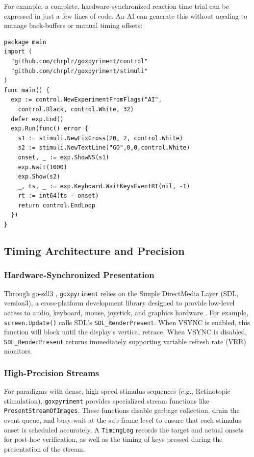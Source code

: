 \documentclass[jou,a4paper]{apa7}
\begin{document}
For example, a complete, hardware-synchronized reaction time trial can be expressed in just a few lines of code. An AI can generate this without needing to manage back-buffers or manual timing offsets:

{\footnotesize
\begin{verbatim}
package main
import (
  "github.com/chrplr/goxpyriment/control"
  "github.com/chrplr/goxpyriment/stimuli"
)
func main() {
  exp := control.NewExperimentFromFlags("AI",
    control.Black, control.White, 32)
  defer exp.End()
  exp.Run(func() error {
    s1 := stimuli.NewFixCross(20, 2, control.White)
    s2 := stimuli.NewTextLine("GO",0,0,control.White)
    onset, _ := exp.ShowNS(s1)
    exp.Wait(1000)
    exp.Show(s2)
    _, ts, _ := exp.Keyboard.WaitKeysEventRT(nil, -1)
    rt := int64(ts - onset)
    return control.EndLoop
  })
}
\end{verbatim}
}



\subsection{Timing Architecture and Precision}\label{timing-architecture}

\subsubsection{Hardware-Synchronized Presentation}\label{hardware-sync}

Through go-sdl3 \parencite{gosdl3}, \texttt{goxpyriment} relies on the
Simple DirectMedia Layer (SDL, version3), a cross-platform development
library designed to provide low-level access to audio, keyboard,
mouse, joystick, and graphics hardware \parencite{sdl3}. For example,
\texttt{screen.Update()} calls SDL's \texttt{SDL\_RenderPresent}. When
VSYNC is enabled, this function will block until the display's
vertical retrace. When VSYNC is disabled, \texttt{SDL\_RenderPresent}
returns immediately supporting variable refresh rate (VRR)
monitors.

\subsubsection{High-Precision Streams}\label{high-precision-streams}

For paradigms with dense, high-speed stimulus sequences (e.g., Retinotopic stimulation),
\texttt{goxpyriment} provides specialized stream functions like
\texttt{PresentStreamOfImages}. These functions disable garbage collection,
drain the event queue, and busy-wait at the sub-frame level to ensure
that each stimulus onset is scheduled accurately. A \texttt{TimingLog}
records the target and actual onsets for post-hoc verification, as
well as the timing of keys pressed during the presentation of the
stream.
\end{document}
